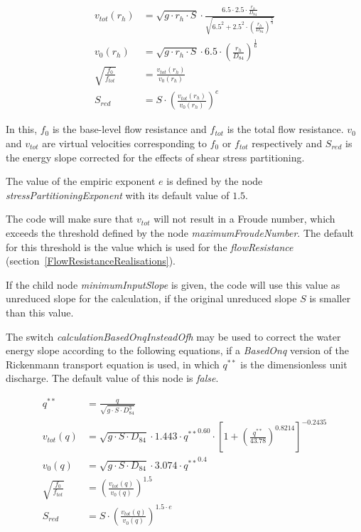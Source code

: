 \documentclass[11pt,a4paper]{article}
\begin{document}
\begin{subequations}
\begin{align}
v_{tot}\left(r_h\right) &= \sqrt{g \cdot r_h \cdot S} \cdot \frac{6.5 \cdot 2.5 \cdot \frac{r_h}{D_{84}}}{\sqrt{6.5^2 + 2.5^2 \cdot \left( \frac{r_h}{D_{84}} \right)^\frac{5}{3}}} \label{ReducedSlopeBasedOnThetaStart} \\
v_{0}\left(r_h\right) &= \sqrt{g \cdot r_h \cdot S} \cdot 6.5 \cdot \left( \frac{r_h}{D_{84}} \right)^\frac{1}{6} \\
\sqrt{\frac{f_0}{f_{tot}}} &= \frac{v_{tot}\left(r_h\right)}{v_{0}\left(r_h\right)} \\
S_{red} &= S \cdot \left(\frac{v_{tot}\left(r_h\right)}{v_{0}\left(r_h\right)}\right)^e \label{ReducedSlopeBasedOnTheta}
\end{align}
\end{subequations}

In this, $f_0$ is the base-level flow resistance and $f_{tot}$ is the total flow resistance. $v_0$ and $v_{tot}$ are virtual velocities corresponding to $f_0$ or $f_{tot}$ respectively and $S_{red} $ is the energy slope corrected for the effects of shear stress partitioning.

The value of the empiric exponent $e$ is defined by the node \emph{stressPartitioningExponent} with its default value of $1.5$.

The code will make sure that $v_{tot}$ will not result in a Froude number, which exceeds the threshold defined by the node \emph{maximumFroudeNumber}. The default for this threshold is the value which is used for the \emph{flowResistance} (section~\ref{FlowResistanceRealisations}).

If the child node \emph{minimumInputSlope} is given, the code will use this value as unreduced slope for the calculation, if the original unreduced slope $S$ is smaller than this value.

The switch \emph{calculationBasedOnqInsteadOfh} may be used to correct the water energy slope according to the following equations, if a \emph{BasedOnq} version of the Rickenmann transport equation is used, in which $q^{\ast\ast}$ is the dimensionless unit discharge. The default value of this node is \emph{false}.

\begin{subequations}
\begin{align}
q^{\ast\ast} &= \frac{q}{\sqrt{g \cdot S \cdot D_{84}^3}} \\
v_{tot}\left(q\right) &= \sqrt{g \cdot S \cdot D_{84}} \cdot 1.443 \cdot {q^{\ast\ast}}^{0.60} \cdot \left[ 1 + \left( \frac{q^{\ast\ast}}{43.78} \right)^{0.8214} \right]^{-0.2435} \\
v_{0}\left(q\right) &= \sqrt{g \cdot S \cdot D_{84}} \cdot 3.074 \cdot {q^{\ast\ast}}^{0.4} \\
\sqrt{\frac{f_0}{f_{tot}}} &= \left(\frac{v_{tot}\left(q\right)}{v_{0}\left(q\right)}\right)^{1.5} \\
S_{red} &= S \cdot \left(\frac{v_{tot}\left(q\right)}{v_{0}\left(q\right)}\right)^{1.5\cdot{}e} \label{ReducedSlopeBasedOnq}
\end{align}
\end{subequations}
\end{document}
